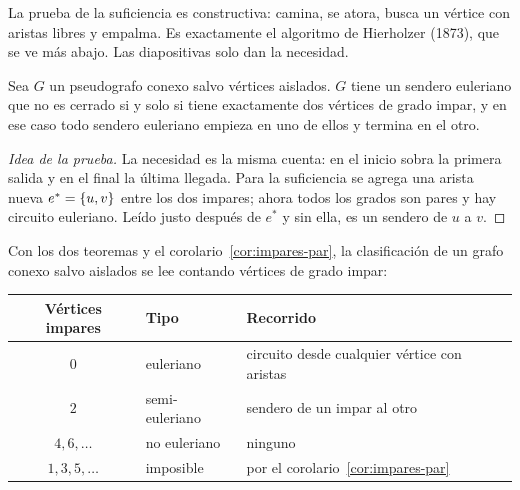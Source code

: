\documentclass[11pt,letterpaper]{article}
\begin{document}
La prueba de la suficiencia es constructiva: camina, se atora, busca
un vértice con aristas libres y empalma. Es exactamente el algoritmo
de Hierholzer (1873), que se ve más abajo. Las diapositivas solo dan
la necesidad.

\begin{teorema}
  \label{teo:euler-sendero}
  Sea $G$ un pseudografo conexo salvo vértices aislados. $G$ tiene un
  sendero euleriano que no es cerrado si y solo si tiene exactamente
  dos vértices de grado impar, y en ese caso todo sendero euleriano
  empieza en uno de ellos y termina en el otro.
\end{teorema}

\begin{proof}[Idea de la prueba]
  La necesidad es la misma cuenta: en el inicio sobra la primera
  salida y en el final la última llegada. Para la suficiencia se
  agrega una arista nueva $e^{*} = \left\{ u, v \right\}$ entre los dos impares;
  ahora todos los grados son pares y hay circuito euleriano. Leído
  justo después de $e^{*}$ y sin ella, es un sendero de $u$ a $v$.
\end{proof}

Con los dos teoremas y el corolario~\ref{cor:impares-par}, la
clasificación de un grafo conexo salvo aislados se lee contando
vértices de grado impar:

\begin{center}
\small
\begin{tabular}{cll}
  \toprule
  \textbf{Vértices impares} & \textbf{Tipo} & \textbf{Recorrido} \\
  \midrule
  $0$ & euleriano & circuito desde cualquier vértice con aristas \\
  $2$ & semi-euleriano & sendero de un impar al otro \\
  $4, 6, \dots$ & no euleriano & ninguno \\
  $1, 3, 5, \dots$ & imposible & por el corolario~\ref{cor:impares-par}
    \\
  \bottomrule
\end{tabular}
\end{center}
\end{document}
